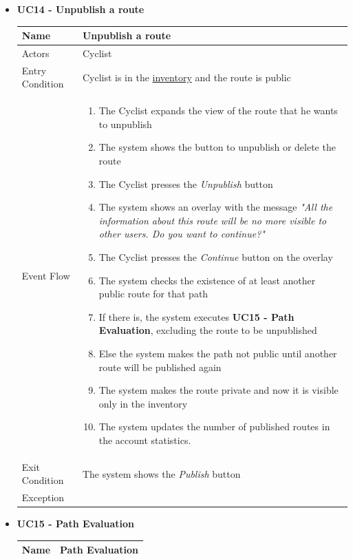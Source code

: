 \begin{itemize}
\newpage
\item \textbf{UC14 - Unpublish a route}\par\smallskip
\noindent
\begin{tabular}{|p{7cm}|p{7cm}|}
\hline
Name            & Unpublish a route \\ \hline
Actors          & Cyclist \\ \hline
Entry Condition & Cyclist is in the \hyperref[fig:Inventory]{ inventory} and the route is public\\ \hline
Event Flow      &
\begin{enumerate}
    \item The Cyclist expands the view of the route that he wants to unpublish  
    \item The system shows the button to unpublish or delete the route 
    \item The Cyclist presses the \textit{Unpublish} button
    \item The system shows an overlay with the message \textit{"All the information about this route will be no more visible to other users. Do you want to continue?"} 
    \item The Cyclist presses the \textit{Continue} button on the overlay
    \item The system checks the existence of at least another public route for that path
    \item If there is, the system executes \textbf{UC15 - Path Evaluation}, excluding the route to be unpublished
    \item Else the system makes the path not public until another route will be published again
    \item The system makes the route private and now it is visible only in the inventory
    \item The system updates the number of published routes in the account statistics.
\end{enumerate}
\\ \hline
Exit Condition  & The system shows the \textit{Publish} button \\ \hline
Exception       &
\\ \hline
\end{tabular}
\newpage
\item \textbf{UC15 - Path Evaluation}\par\smallskip
\noindent
\begin{tabular}{|p{7cm}|p{7cm}|}
\hline
Name            & Path Evaluation \\ \hline

\end{tabular}
\end{itemize}
